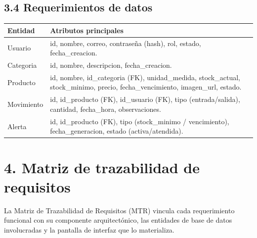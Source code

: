 \documentclass[12pt, letterpaper]{report}
\begin{document}
\subsection*{3.4 Requerimientos de datos}

\noindent
\begin{tabular}{|p{3cm}|p{10.5cm}|}
\hline
\textbf{Entidad} & \textbf{Atributos principales} \\
\hline
Usuario & id, nombre, correo, contraseña (hash), rol, estado, fecha\_creacion. \\
\hline
Categoria & id, nombre, descripcion, fecha\_creacion. \\
\hline
Producto & id, nombre, id\_categoria (FK), unidad\_medida, stock\_actual, stock\_minimo, precio, fecha\_vencimiento, imagen\_url, estado. \\
\hline
Movimiento & id, id\_producto (FK), id\_usuario (FK), tipo (entrada/salida), cantidad, fecha\_hora, observaciones. \\
\hline
Alerta & id, id\_producto (FK), tipo (stock\_minimo / vencimiento), fecha\_generacion, estado (activa/atendida). \\
\hline
\end{tabular}

\section*{4. Matriz de trazabilidad de requisitos}

La Matriz de Trazabilidad de Requisitos (MTR) vincula cada
requerimiento funcional con su componente arquitectónico, las entidades
de base de datos involucradas y la pantalla de interfaz que lo
materializa.
\end{document}

